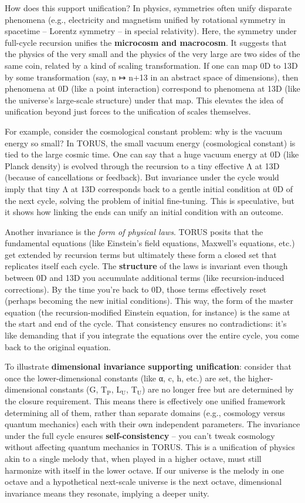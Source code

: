 \documentclass[]{article}
\newcommand{\subscript}[1]{\ensuremath{_{\mathrm{#1}}}}
\begin{document}
How does this support unification? In physics, symmetries often unify
disparate phenomena (e.g., electricity and magnetism unified by
rotational symmetry in spacetime -- Lorentz symmetry -- in special
relativity). Here, the symmetry under full-cycle recursion unifies the
\textbf{microcosm and macrocosm}. It suggests that the physics of the
very small and the physics of the very large are two sides of the same
coin, related by a kind of scaling transformation. If one can map 0D to
13D by some transformation (say, n ↦ n+13 in an abstract space of
dimensions), then phenomena at 0D (like a point interaction) correspond
to phenomena at 13D (like the universe's large-scale structure) under
that map. This elevates the idea of unification beyond just forces to
the unification of scales themselves.

For example, consider the cosmological constant problem: why is the
vacuum energy so small? In TORUS, the small vacuum energy (cosmological
constant) is tied to the large cosmic time. One can say that a huge
vacuum energy at 0D (like Planck density) is evolved through the
recursion to a tiny effective Λ at 13D (because of cancellations or
feedback). But invariance under the cycle would imply that tiny Λ at 13D
corresponds back to a gentle initial condition at 0D of the next cycle,
solving the problem of initial fine-tuning. This is speculative, but it
shows how linking the ends can unify an initial condition with an
outcome.

Another invariance is the \emph{form of physical laws}. TORUS posits
that the fundamental equations (like Einstein's field equations,
Maxwell's equations, etc.) get extended by recursion terms but
ultimately these form a closed set that replicates itself each cycle.
The \textbf{structure} of the laws is invariant even though between 0D
and 13D you accumulate additional terms (like recursion-induced
corrections). By the time you're back to 0D, those terms effectively
reset (perhaps becoming the new initial conditions). This way, the form
of the master equation (the recursion-modified Einstein equation, for
instance) is the same at the start and end of the cycle​. That
consistency ensures no contradictions: it's like demanding that if you
integrate the equations over the entire cycle, you come back to the
original equation.

To illustrate \textbf{dimensional invariance supporting unification}:
consider that once the lower-dimensional constants (like α, c, h, etc.)
are set, the higher-dimensional constants (G,
T\subscript{P},
L\subscript{U},
T\subscript{U}) are no
longer free but are determined by the closure requirement​. This means
there is effectively one unified framework determining all of them,
rather than separate domains (e.g., cosmology versus quantum mechanics)
each with their own independent parameters. The invariance under the
full cycle ensures \textbf{self-consistency} -- you can't tweak
cosmology without affecting quantum mechanics in TORUS. This is a
unification of physics akin to a single melody that, when played in a
higher octave, must still harmonize with itself in the lower octave. If
our universe is the melody in one octave and a hypothetical next-scale
universe is the next octave, dimensional invariance means they resonate,
implying a deeper unity.
\end{document}
